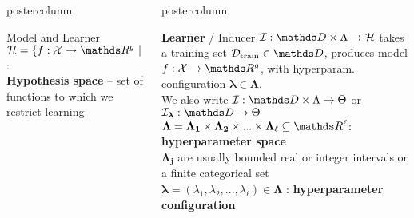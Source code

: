 \documentclass{beamer}
\begin{document}
\begin{frame}[fragile]{}
\begin{columns}
\begin{column}{.31\textwidth}
\begin{beamercolorbox}[center]{postercolumn}
\begin{minipage}{.98\textwidth}
{\begin{myblock}{Model and Learner}
$\Hspace = \{f : \Xspace \rightarrow \R^g ~|~ f \text{ belongs to a certain functional family}\}$ : \\ \textbf{Hypothesis space} -- set of functions to which we restrict learning
				
\end{myblock}\vfill
				}
			\end{minipage}
		\end{beamercolorbox}
	\end{column}
	\begin{column}{.31\textwidth}
		\begin{beamercolorbox}[center]{postercolumn}
			\begin{minipage}{.98\textwidth}
				\parbox[t][\columnheight]{\textwidth}{
\begin{myblock}{} \vspace{-4ex}

\textbf{Learner} / Inducer $\ind: \preimageInducerShort \rightarrow \Hspace$  takes a training set  $\Dtrain \in \allDatasets$, produces model $f : \Xspace \rightarrow \R^g$, with hyperparam. configuration $\bm{\lambda} \in \bm{\Lambda}$.\\
We also write $\ind: \preimageInducerShort \rightarrow \Theta$ or $\ind_{\bm{\lambda} }: \allDatasets \rightarrow \Theta$ \\

$\bm{\Lambda} = \bm{\Lambda_1} \times \bm{\Lambda_2} \times ... \times \bm{\Lambda_}{\ell} \subseteq \R^{\ell}$: %
\textbf{hyperparameter space} \\
$\bm{\Lambda_j} $ are usually bounded real or integer intervals or a finite categorical set\\

$\bm{\lambda} = (\lambda_1, \lambda_2, ..., \lambda_{\ell}) \in \bm{\Lambda}$ : \textbf{hyperparameter configuration} \\





\end{myblock}}
\end{minipage}
\end{beamercolorbox}
\end{column}
\end{columns}
\end{frame}
\end{document}
